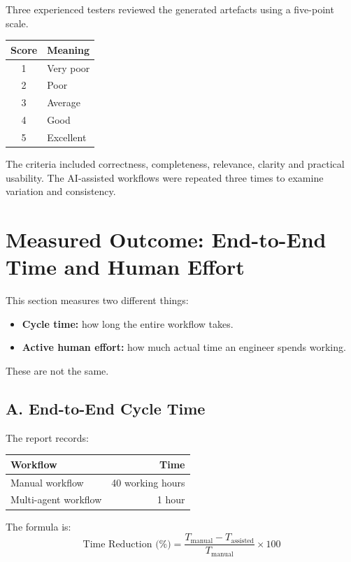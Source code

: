 \documentclass[11pt,a4paper]{article}
\begin{document}
Three experienced testers reviewed the generated artefacts using a five-point scale.

\begin{center}
\begin{tabular}{cl}
\toprule
\textbf{Score} & \textbf{Meaning}\\
\midrule
1 & Very poor\\
2 & Poor\\
3 & Average\\
4 & Good\\
5 & Excellent\\
\bottomrule
\end{tabular}
\end{center}

The criteria included correctness, completeness, relevance, clarity and practical usability. The AI-assisted workflows were repeated three times to examine variation and consistency.

\section{Measured Outcome: End-to-End Time and Human Effort}

This section measures two different things:
\begin{itemize}
  \item \textbf{Cycle time:} how long the entire workflow takes.
  \item \textbf{Active human effort:} how much actual time an engineer spends working.
\end{itemize}
These are not the same.

\subsection{A. End-to-End Cycle Time}

The report records:

\begin{center}
\begin{tabular}{lr}
\toprule
\textbf{Workflow} & \textbf{Time}\\
\midrule
Manual workflow & 40 working hours\\
Multi-agent workflow & 1 hour\\
\bottomrule
\end{tabular}
\end{center}

The formula is:
\[
\text{Time Reduction (\%)} =
\frac{T_{\text{manual}}-T_{\text{assisted}}}
     {T_{\text{manual}}}\times 100
\]
\end{document}
